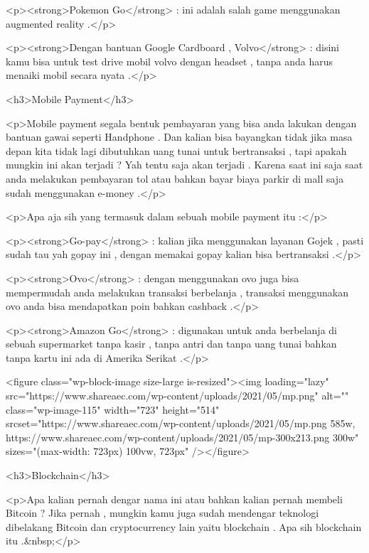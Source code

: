 <p><strong>Pokemon Go</strong> : ini adalah salah game menggunakan augmented reality .</p>



<p><strong>Dengan bantuan Google Cardboard , Volvo</strong> : disini kamu bisa untuk test drive mobil volvo dengan headset , tanpa anda harus menaiki mobil secara nyata .</p>



<h3>Mobile Payment</h3>



<p>Mobile payment segala bentuk pembayaran yang bisa anda lakukan dengan bantuan gawai seperti Handphone . Dan kalian bisa bayangkan tidak jika masa depan kita tidak lagi dibutuhkan uang tunai untuk bertransaksi , tapi apakah mungkin ini akan terjadi ? Yah tentu saja akan terjadi . Karena saat ini saja saat anda melakukan pembayaran tol atau bahkan bayar biaya parkir di mall saja sudah menggunakan e-money .</p>



<p>Apa aja sih yang termasuk dalam sebuah mobile payment itu :</p>



<p><strong>Go-pay</strong> : kalian jika menggunakan layanan Gojek , pasti sudah tau yah gopay ini , dengan memakai gopay kalian bisa bertransaksi .</p>



<p><strong>Ovo</strong> : dengan menggunakan ovo juga bisa mempermudah anda melakukan transaksi berbelanja , transaksi menggunakan ovo anda bisa mendapatkan poin bahkan cashback .</p>



<p><strong>Amazon Go</strong> : digunakan untuk anda berbelanja di sebuah supermarket tanpa kasir , tanpa antri dan tanpa uang tunai bahkan tanpa kartu ini ada di Amerika Serikat .</p>



<figure class="wp-block-image size-large is-resized"><img loading="lazy" src="https://www.shareaec.com/wp-content/uploads/2021/05/mp.png" alt="" class="wp-image-115" width="723" height="514" srcset="https://www.shareaec.com/wp-content/uploads/2021/05/mp.png 585w, https://www.shareaec.com/wp-content/uploads/2021/05/mp-300x213.png 300w" sizes="(max-width: 723px) 100vw, 723px" /></figure>



<h3>Blockchain</h3>



<p>Apa kalian pernah dengar nama ini atau bahkan kalian pernah membeli Bitcoin ? Jika pernah , mungkin kamu juga sudah mendengar teknologi dibelakang Bitcoin dan cryptocurrency lain yaitu blockchain . Apa sih blockchain itu .&nbsp;</p>



